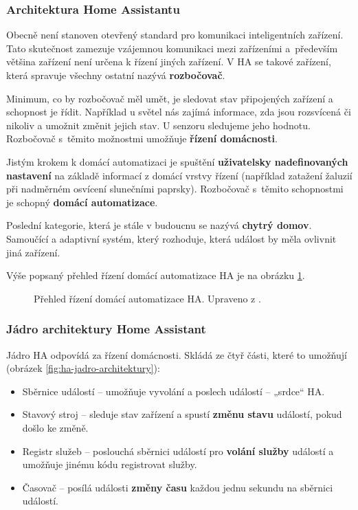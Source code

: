 \subsubsection{Architektura Home Assistantu}
Obecně není stanoven otevřený standard pro komunikaci inteligentních zařízení. Tato skutečnost zamezuje vzájemnou komunikaci mezi zařízeními a~především většina zařízení není určena k řízení jiných zařízení. V HA se takové zařízení, která spravuje všechny ostatní nazývá \textbf{rozbočovač}.

Minimum, co by rozbočovač měl umět, je sledovat stav připojených zařízení a schopnost je řídit. Například u světel nás zajímá informace, zda jsou rozsvícená či nikoliv a umožnit změnit jejich stav. U senzoru sledujeme jeho hodnotu. Rozbočovač s~těmito možnostmi umožňuje \textbf{řízení domácnosti}.

Jistým krokem k domácí automatizaci je spuštění \textbf{uživatelsky nadefinovaných nastavení} na základě informací z domácí vrstvy řízení (například zatažení žaluzií při nadměrném osvícení slunečními paprsky). Rozbočovač s~těmito schopnostmi je schopný \textbf{domácí automatizace}.

Poslední kategorie, která je stále v budoucnu se nazývá \textbf{chytrý domov}. Samoučící a adaptivní systém, který rozhoduje, která událost by měla ovlivnit jiná zařízení.

Výše popsaný přehled řízení domácí automatizace HA je na obrázku \ref{fig:ha-prehled-domaci-autmatizace}.


\begin{figure}[H]
    \centering
    \def\svgwidth{\columnwidth}
    
    \caption[Přehled řízení domácí automatizace HA.]{Přehled řízení domácí automatizace HA. Upraveno z \cite{home-assistant-architektura}.}
    \label{fig:ha-prehled-domaci-autmatizace}
\end{figure}

\subsubsection{Jádro architektury Home Assistant}
Jádro HA odpovídá za řízení domácnosti. Skládá ze čtyř části, které to umožňují (obrázek \ref{fig:ha-jadro-architektury}):

\begin{itemize}
\item Sběrnice událostí – umožňuje vyvolání a poslech událostí – „srdce“ HA.
\item Stavový stroj – sleduje stav zařízení a spustí \textbf{změnu stavu} událostí, pokud došlo ke změně.
\item  Registr služeb – poslouchá sběrnici událostí pro \textbf{volání služby} událostí a umožňuje jinému kódu registrovat služby.
\item Časovač – posílá události \textbf{změny času} každou jednu sekundu na sběrnici událostí.
\end{itemize}

